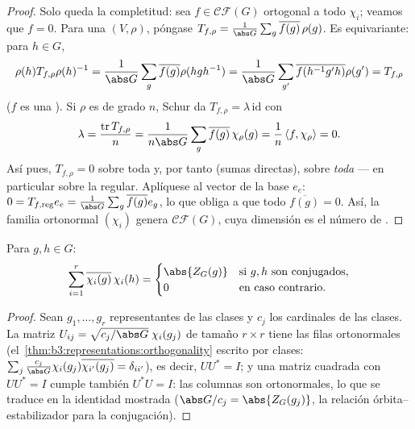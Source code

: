 \begin{proof}
Solo queda la completitud: sea $f \in \mathcal{CF}(G)$ ortogonal a todo
$\chi_i$; veamos que $f = 0$. Para una
 $(V,\rho)$, póngase
$T_{f,\rho} = \frac{1}{\abs G}
\sum_g \overline{f(g)}\,\rho(g)$. Es equivariante: para $h \in
G$,
\[
\rho(h)T_{f,\rho}\rho(h)^{-1} = \frac1{\abs G}\sum_g
\overline{f(g)}\rho(hgh^{-1})
= \frac1{\abs G}\sum_{g'}\overline{f(h^{-1}g'h)}\rho(g') =
T_{f,\rho}
\]
($f$ es una ). Si $\rho$ es 
de grado $n$, Schur da $T_{f,\rho} = \lambda\,\mathrm{id}$ con
\[
\lambda = \frac{\operatorname{tr}T_{f,\rho}}{n}
= \frac{1}{n\abs G}\sum_g \overline{f(g)}\,\chi_\rho(g)
= \frac1n\,\langle f, \chi_\rho\rangle = 0 .
\]
Así pues, $T_{f,\rho} = 0$ sobre toda
 y, por tanto (sumas
directas), sobre \emph{toda}
 --- en particular
sobre la regular. Aplíquese al vector de la base $e_e$:
$0 = T_{f,\mathrm{reg}}e_e =
\frac1{\abs G}\sum_g\overline{f(g)}e_g$, lo que obliga a que todo
$\overline{f(g)} = 0$. Así, la familia ortonormal $(\chi_i)$ genera
$\mathcal{CF}(G)$, cuya dimensión es el número de
.
\end{proof}

\begin{corollary}
\label{cor:b3:representations:column}
Para $g, h \in G$:
\[
\sum_{i=1}^{r}\overline{\chi_i(g)}\,\chi_i(h) =
\begin{cases}
\abs{Z_G(g)} & \text{si } g, h \text{ son conjugados},\\
0 & \text{en caso contrario.}
\end{cases}
\]
\end{corollary}

\begin{proof}
Sean $g_1, \dots, g_r$ representantes de las clases y $c_j$ los
cardinales de las clases. La matriz $U_{ij} =
\sqrt{c_j/\abs G}\;\chi_i(g_j)$ de tamaño $r \times r$ tiene las filas
ortonormales (el~\cref{thm:b3:representations:orthogonality} escrito por
clases: $\sum_j \frac{c_j}{\abs G}\chi_i(g_j)\overline{\chi_{i'}(g_j)} =
\delta_{ii'}$), es decir, $UU^* = I$; y una matriz cuadrada con $UU^* =
I$ cumple también $U^*U = I$: las columnas son ortonormales, lo que se
traduce en la identidad mostrada ($\abs G/c_j = \abs{Z_G(g_j)}$, la
relación órbita--estabilizador para la conjugación).
\end{proof}

